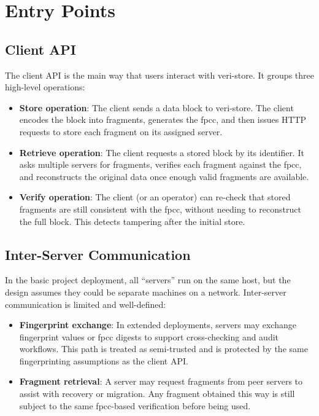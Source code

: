 \documentclass[../veristore_security_model.tex]{subfiles}
\begin{document}
\section{Entry Points}


\subsection{Client API}

The client API is the main way that users interact with veri-store. It groups three high-level operations:
\begin{itemize}
    \item \textbf{Store operation}: The client sends a data block to veri-store. The client encodes the block into fragments, generates the fpcc, and then issues HTTP requests to store each fragment on its assigned server.
    \item \textbf{Retrieve operation}: The client requests a stored block by its identifier. It asks multiple servers for fragments, verifies each fragment against the fpcc, and reconstructs the original data once enough valid fragments are available.
    \item \textbf{Verify operation}: The client (or an operator) can re-check that stored fragments are still consistent with the fpcc, without needing to reconstruct the full block. This detects tampering after the initial store.
\end{itemize}

\subsection{Inter-Server Communication}

In the basic project deployment, all ``servers'' run on the same host, but the design assumes they could be separate machines on a network. Inter-server communication is limited and well-defined:
\begin{itemize}
    \item \textbf{Fingerprint exchange}: In extended deployments, servers may exchange fingerprint values or fpcc digests to support cross-checking and audit workflows. This path is treated as semi-trusted and is protected by the same fingerprinting assumptions as the client API.
    \item \textbf{Fragment retrieval}: A server may request fragments from peer servers to assist with recovery or migration. Any fragment obtained this way is still subject to the same fpcc-based verification before being used.
\end{itemize}
\end{document}
